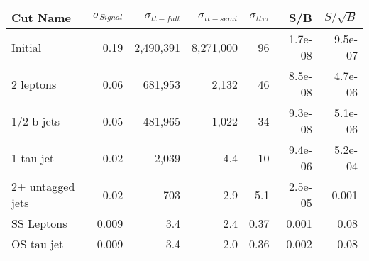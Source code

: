 \begin{tabular}{lrrrrrr}
\toprule
         Cut Name &  $\sigma_{Signal}$ &  $\sigma_{tt-full}$ &  $\sigma_{tt-semi}$ &  $\sigma_{tt\tau\tau}$ &     S/B &  $S/\sqrt{B}$ \\
\midrule
          Initial &               0.19 &           2,490,391 &           8,271,000 &                     96 & 1.7e-08 &       9.5e-07 \\
        2 leptons &               0.06 &             681,953 &               2,132 &                     46 & 8.5e-08 &       4.7e-06 \\
       1/2 b-jets &               0.05 &             481,965 &               1,022 &                     34 & 9.3e-08 &       5.1e-06 \\
        1 tau jet &               0.02 &               2,039 &                 4.4 &                     10 & 9.4e-06 &       5.2e-04 \\
 2+ untagged jets &               0.02 &                 703 &                 2.9 &                    5.1 & 2.5e-05 &         0.001 \\
       SS Leptons &              0.009 &                 3.4 &                 2.4 &                   0.37 &   0.001 &          0.08 \\
       OS tau jet &              0.009 &                 3.4 &                 2.0 &                   0.36 &   0.002 &          0.08 \\
\bottomrule
\end{tabular}
